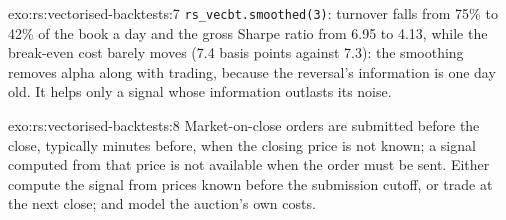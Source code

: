 \begin{solution}{exo:rs:vectorised-backtests:7}
\texttt{rs\_vecbt.smoothed(3)}: turnover falls from 75\% to 42\% of the book a day and the gross Sharpe ratio from 6.95 to 4.13, while the break-even cost
barely moves (7.4 basis points against 7.3): the smoothing removes alpha along with trading, because the reversal's information is one day old. It helps
only a signal whose information outlasts its noise.
\end{solution}

\begin{solution}{exo:rs:vectorised-backtests:8}
Market-on-close orders are submitted before the close, typically minutes before, when the closing price is not known; a signal computed from that price is
not available when the order must be sent. Either compute the signal from prices known before the submission cutoff, or trade at the next close; and model
the auction's own costs.
\end{solution}

